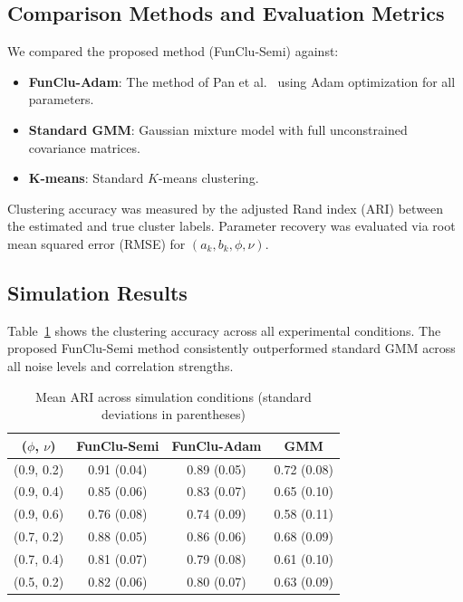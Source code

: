 \documentclass[12pt,a4paper]{article}
\begin{document}
\subsection{Comparison Methods and Evaluation Metrics}

We compared the proposed method (FunClu-Semi) against:
\begin{itemize}[leftmargin=*]
    \item \textbf{FunClu-Adam}: The method of Pan et al.~\cite{pan2026improved} using Adam optimization for all parameters.
    \item \textbf{Standard GMM}: Gaussian mixture model with full unconstrained covariance matrices.
    \item \textbf{K-means}: Standard $K$-means clustering.
\end{itemize}

Clustering accuracy was measured by the adjusted Rand index (ARI) between the estimated and true cluster labels. Parameter recovery was evaluated via root mean squared error (RMSE) for $(a_k, b_k, \phi, \nu)$.

\subsection{Simulation Results}

Table~\ref{tab:sim_results} shows the clustering accuracy across all experimental conditions. The proposed FunClu-Semi method consistently outperformed standard GMM across all noise levels and correlation strengths.

\begin{table}[htbp]
    \centering
    \caption{Mean ARI across simulation conditions (standard deviations in parentheses)}
    \label{tab:sim_results}
    \begin{tabular}{cccc}
        \toprule
        ($\phi$, $\nu$) & FunClu-Semi & FunClu-Adam & GMM \\
        \midrule
        (0.9, 0.2) & 0.91 (0.04) & 0.89 (0.05) & 0.72 (0.08) \\
        (0.9, 0.4) & 0.85 (0.06) & 0.83 (0.07) & 0.65 (0.10) \\
        (0.9, 0.6) & 0.76 (0.08) & 0.74 (0.09) & 0.58 (0.11) \\
        (0.7, 0.2) & 0.88 (0.05) & 0.86 (0.06) & 0.68 (0.09) \\
        (0.7, 0.4) & 0.81 (0.07) & 0.79 (0.08) & 0.61 (0.10) \\
        (0.5, 0.2) & 0.82 (0.06) & 0.80 (0.07) & 0.63 (0.09) \\
        \bottomrule
    \end{tabular}
\end{table}
\end{document}
